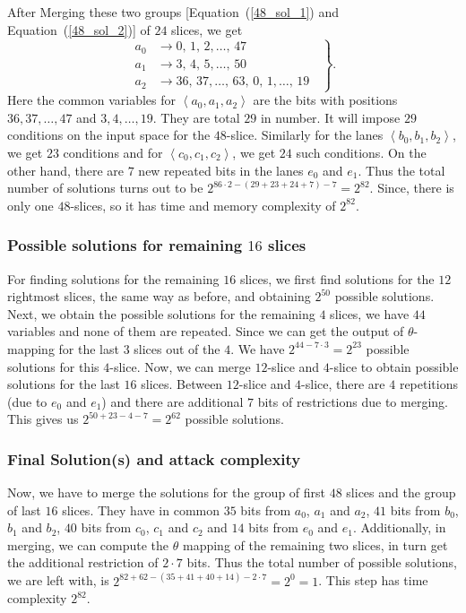 \documentclass[runningheads]{llncs}
\begin{document}
After Merging these two groups [Equation~(\ref{48_sol_1}) and 
Equation~(\ref{48_sol_2})] of $24$ slices, we get
\begin{equation}
	\left.
	\begin{aligned}       
    a_0 &\rightarrow 0,\, 1,\, 2,\ldots ,\, 47\\
    a_1 & \rightarrow 3,\, 4,\, 5,\ldots ,\, 50\\
    a_2 & \rightarrow 36,\, 37,\ldots,\, 63,\, 0,\, 1,\ldots ,\, 19
    \end{aligned}
	\;\;\right\}.
\end{equation}
Here the common variables for $\left< a_0, a_1,a_2\right>$ are the bits with positions
$36, 37 ,\ldots, 47$ and $ 3, 4,\ldots,19$. They are total $29$ in number. It will impose $29$ conditions on the input space for the $48$-slice.
Similarly for the lanes $\left< b_0, b_1,b_2\right>$, we get $23$ conditions and for $\left< c_0, c_1,c_2 \right>$, we get $24$ such conditions.
On the other hand, there are $7$ new repeated bits in the lanes $e_0$ and $e_1$. Thus the total number of solutions turns out to be $2^{86\cdot 2 - (29 + 23 + 24 + 7) - 7 } = 2^{82}$. Since, there is only one $48$-slices, so it has time and memory complexity of $2^{82}$.

\subsubsection{Possible solutions for remaining $16$ slices} 
For finding solutions for the remaining $16$ slices, we first find solutions for the $12$ rightmost slices, the same way as before, and obtaining $2^{50}$ possible solutions. 
Next, we obtain the possible solutions for the remaining $4$ slices, we have $44$ variables and none of them are repeated. Since we can get the output of $\theta$-mapping for the last $3$ slices out of the $4$. We have  $2^{44 - 7\cdot 3} = 2^{23}$ possible solutions for this $4$-slice.
Now, we can merge $12$-slice and $4$-slice to obtain possible solutions for the last $16$ slices. Between $12$-slice and $4$-slice, there are $4$ repetitions (due to $e_0$ and $e_1$) and there are additional $7$ bits of restrictions due to merging. This gives us $2^{50 + 23 - 4 -7} = 2^{62}$ possible solutions.
\subsubsection{Final Solution(s) and attack complexity}
Now, we have to merge the solutions for the group of first $48$ slices and the group of last $16$ slices. They have in common $35$ bits from $a_0$, $a_1$ and  $a_2$, $41$ bits from $b_0$, $b_1$ and $b_2$, $40$ bits from $c_0$, $c_1$ and $c_2$ and $14$ bits from $e_0$ and $e_1$. Additionally, in merging, we can compute the $\theta$ mapping of the remaining two slices, in turn get the additional restriction of $2\cdot 7$ bits. Thus the total number of possible solutions, we are left with, is $2^{82 + 62 - (35+ 41 + 40 + 14) - 2 \cdot 7} = 2^{0} = 1$. This step has time complexity $ 2^{82}$.
\end{document}
